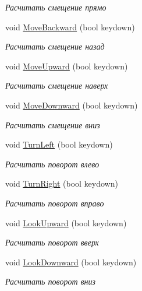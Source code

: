 \begin{DoxyCompactItemize}
\begin{DoxyCompactList}\small\item\em Расчитать смещение прямо \end{DoxyCompactList}\item 
void \hyperlink{class_position_class_a76269efeeb56583019ae5c90a7b38b64}{Move\+Backward} (bool keydown)
\begin{DoxyCompactList}\small\item\em Расчитать смещение назад \end{DoxyCompactList}\item 
void \hyperlink{class_position_class_a1f52e86807015fe0be8216a954e763cd}{Move\+Upward} (bool keydown)
\begin{DoxyCompactList}\small\item\em Расчитать смещение наверх \end{DoxyCompactList}\item 
void \hyperlink{class_position_class_a44c53730208a688ec5f1fbcbf358a848}{Move\+Downward} (bool keydown)
\begin{DoxyCompactList}\small\item\em Расчитать смещение вниз \end{DoxyCompactList}\item 
void \hyperlink{class_position_class_ae75cc0ecd43a510136b7df82f1f83ccd}{Turn\+Left} (bool keydown)
\begin{DoxyCompactList}\small\item\em Расчитать поворот влево \end{DoxyCompactList}\item 
void \hyperlink{class_position_class_a05ceeb5f95a3a800dea17f4a090fd288}{Turn\+Right} (bool keydown)
\begin{DoxyCompactList}\small\item\em Расчитать поворот вправо \end{DoxyCompactList}\item 
void \hyperlink{class_position_class_a1643d2ad4f9807b464f1ea9d40fe6ad6}{Look\+Upward} (bool keydown)
\begin{DoxyCompactList}\small\item\em Расчитать поворот вверх \end{DoxyCompactList}\item 
void \hyperlink{class_position_class_a244538ba3f1719f4d72798d41500df2a}{Look\+Downward} (bool keydown)
\begin{DoxyCompactList}\small\item\em Расчитать поворот вниз \end{DoxyCompactList}\end{DoxyCompactItemize}
